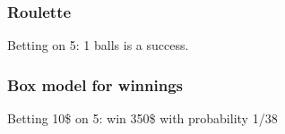 \documentclass[handout]{beamer}
\begin{document}


   \begin{frame}
   \frametitle{Roulette}
   \begin{center}
   \end{center}
   Betting on {\color{red} 5}: 1 balls is a success.
   \end{frame}



   \begin{frame}
   \frametitle{Box model for winnings}
   \begin{center}
   \end{center}
   Betting 10\$ on {\color{red} 5}: win 350\$ with probability 1/38
   \end{frame}
\end{document}
